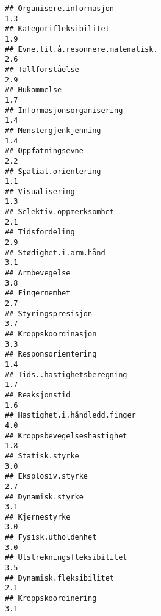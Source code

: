 \documentclass[
]{article}
\begin{document}
\begin{verbatim}
## Organisere.informasjon                                                           1.3
## Kategorifleksibilitet                                                            1.9
## Evne.til.å.resonnere.matematisk.                                                 2.6
## Tallforståelse                                                                   2.9
## Hukommelse                                                                       1.7
## Informasjonsorganisering                                                         1.4
## Mønstergjenkjenning                                                              1.4
## Oppfatningsevne                                                                  2.2
## Spatial.orientering                                                              1.1
## Visualisering                                                                    1.3
## Selektiv.oppmerksomhet                                                           2.1
## Tidsfordeling                                                                    2.9
## Stødighet.i.arm.hånd                                                             3.1
## Armbevegelse                                                                     3.8
## Fingernemhet                                                                     2.7
## Styringspresisjon                                                                3.7
## Kroppskoordinasjon                                                               3.3
## Responsorientering                                                               1.4
## Tids..hastighetsberegning                                                        1.7
## Reaksjonstid                                                                     1.6
## Hastighet.i.håndledd.finger                                                      4.0
## Kroppsbevegelseshastighet                                                        1.8
## Statisk.styrke                                                                   3.0
## Eksplosiv.styrke                                                                 2.7
## Dynamisk.styrke                                                                  3.1
## Kjernestyrke                                                                     3.0
## Fysisk.utholdenhet                                                               3.0
## Utstrekningsfleksibilitet                                                        3.5
## Dynamisk.fleksibilitet                                                           2.1
## Kroppskoordinering                                                               3.1

\end{verbatim}
\end{document}
